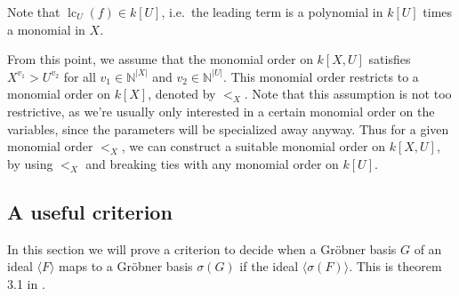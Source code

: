 \documentclass[a4paper, 12pt]{article}
\newcommand{\N}{\mathbb{N}}
\DeclareMathOperator{\LC}{lc}
\theoremstyle{changedot}
\theoremstyle{changedotbreak}
\theoremstyle{nonumberplain}
\begin{document}
Note that $\LC_{U}(f) \in k[U]$, i.e.\ the leading term is a polynomial in $k[U]$ times a monomial in $X$.

From this point, we assume that the monomial order on $k[X, U]$ satisfies $X^{v_{1}} > U^{v_{2}}$ for all $v_{1} \in \N^{|X|}$ and $v_{2} \in \N^{|U|}$. This monomial order restricts to a monomial order on $k[X]$, denoted by $<_{X}$. Note that this assumption is not too restrictive, as we're usually only interested in a certain monomial order on the variables, since the parameters will be specialized away anyway. Thus for a given monomial order $<_{X}$, we can construct a suitable monomial order on $k[X, U]$, by using $<_{X}$ and breaking ties with any monomial order on $k[U]$.

\subsection{A useful criterion}
In this section we will prove a criterion to decide when a Gröbner basis $G$ of an ideal $\langle F \rangle$ maps to a Gröbner basis $\sigma(G)$ if the ideal $\langle \sigma(F) \rangle$. This is theorem 3.1 in \cite{Kalkbrener}.
\end{document}
